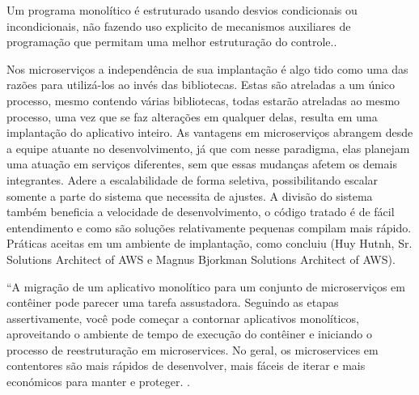Um programa monolítico é estruturado usando desvios condicionais ou incondicionais, não fazendo uso explicito de mecanismos
auxiliares de programação que permitam uma melhor estruturação do controle.\cite{teoria-da-computação-3ed-ufrgs-maquinas-universais-e-computabilidade}.


Nos microserviços a independência de sua implantação é algo tido como uma das razões para utilizá-los ao invés das
bibliotecas. Estas são atreladas a um único processo, mesmo contendo várias bibliotecas, todas estarão atreladas ao mesmo
processo, uma vez que se faz alterações em qualquer delas, resulta em uma implantação do aplicativo inteiro.
As vantagens  em microserviços abrangem desde a equipe atuante no desenvolvimento, já que com nesse paradigma, elas planejam
uma atuação em serviços diferentes, sem que essas mudanças afetem os demais integrantes. Adere a escalabilidade de forma
seletiva, possibilitando escalar somente a parte do sistema que necessita de ajustes. A divisão do sistema também beneficia
a velocidade de desenvolvimento, o código tratado é de fácil entendimento e como são soluções relativamente pequenas 
compilam mais rápido. Práticas aceitas em um ambiente de implantação, como concluiu (Huy Hutnh, Sr. Solutions Architect of
AWS e Magnus Bjorkman Solutions Architect of AWS).


“A migração de um aplicativo monolítico para um conjunto de microserviços em contêiner pode parecer uma tarefa assustadora.
Seguindo as etapas assertivamente, você pode começar a contornar aplicativos monolíticos, aproveitando o ambiente de tempo
de execução do contêiner e iniciando o processo de reestruturação em microservices. No geral, os microservices em 
contentores são mais rápidos de desenvolver, mais fáceis de iterar e mais económicos para manter e proteger.
\cite{deploying-java-microservices-on-amazon-ec2-container-service}.
